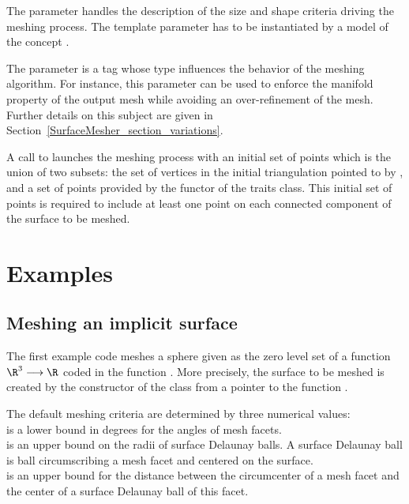 The parameter  handles the description of the size and shape
criteria driving the meshing process. The template parameter 
has to be instantiated by a model of the concept .


The parameter   is a tag 
whose type influences the behavior of the
meshing algorithm. For instance, this parameter
can be used to enforce the manifold property
of the output mesh while avoiding 
an over-refinement of the mesh. Further details on this
subject are given in 
Section~\ref{SurfaceMesher_section_variations}.

A call to 
 launches 
the meshing process with an initial 
set of points which is the union of two subsets:
the set of vertices in the  initial triangulation pointed to by ,
and a set of points provided by the  functor 
of the traits class. This initial set of points is required 
to include at least one point on each connected component of the surface
to be meshed.


\section{Examples}
\label{SurfaceMesher_section_example}

\subsection{Meshing an implicit surface}
The first example code meshes a sphere 
given as the zero level set of a function $\R^3 \longrightarrow \R$
coded in the function .
More precisely, 
the surface to be meshed is created 
by the constructor
of the class 
from a pointer to the function .

The default meshing criteria are determined  by three numerical
values: \\ 
 is a lower bound in degrees for the angles 
     of mesh facets.\\
 is an upper bound on the radii of surface Delaunay
balls. A surface Delaunay ball is ball circumscribing a mesh facet
and centered on the surface. \\
 is an upper bound for the distance 
between the circumcenter of a mesh facet and the center of a surface
Delaunay ball of this facet.


